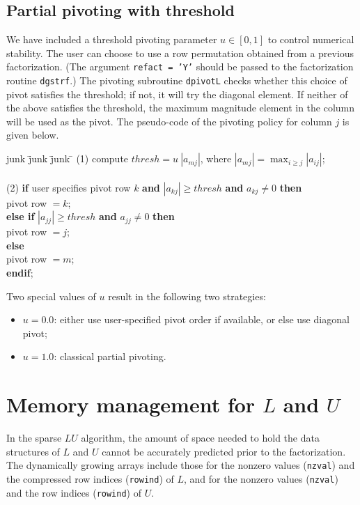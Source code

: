 \subsection{Partial pivoting with threshold}
We have included a threshold pivoting parameter $u\in [0,1]$ to control 
numerical stability. The user can choose to use a row permutation obtained
from a previous factorization. (The argument {\tt *refact = 'Y'} should be
passed to the factorization routine {\tt dgstrf}.) 
The pivoting subroutine {\tt dpivotL} checks whether this choice of pivot
satisfies the threshold; if not, it will try the diagonal element.
If neither of the above satisfies the threshold, 
the maximum magnitude element in the column will be used as the pivot.
The pseudo-code of the pivoting policy for column $j$ is given below.

\begin{tabbing}
junk \= junk \= junk \= \kill
\> (1)\> compute $thresh = u~|a_{mj}|$, where $|a_{mj}|=\max_{i\ge j}|a_{ij}|$;
\\ \\
\> (2)\> {\bf if} user specifies pivot row $k$ {\bf and}
                  $|a_{kj}|\ge thresh$ {\bf and} $a_{kj}\ne 0$ {\bf then} \\
\>    \> \>        pivot row $= k$; \\
\>    \>  {\bf else if } $|a_{jj}| \ge thresh$ 
                         {\bf and} $a_{jj}\ne 0$ {\bf then} \\
\>    \> \>        pivot row $= j$; \\
\>    \>  {\bf else} \\
\>    \> \>        pivot row $= m$; \\
\>    \>  {\bf endif};
\end{tabbing}

Two special values of $u$ result in the following two strategies:
\begin{itemize}
\item $u=0.0$: either use user-specified pivot order if available, 
               or else use diagonal pivot;
\item $u=1.0$: classical partial pivoting.
\end{itemize}


\section{Memory management for $L$ and $U$}
\label{sec:mem}
In the sparse $LU$ algorithm, the amount of space needed to hold the
data structures of $L$ and $U$ cannot be accurately predicted prior to 
the factorization.
The dynamically growing arrays include those for the nonzero values
({\tt nzval}) and the compressed row indices ({\tt rowind}) of $L$, and
for the nonzero values ({\tt nzval}) and the row indices ({\tt rowind}) of $U$.

